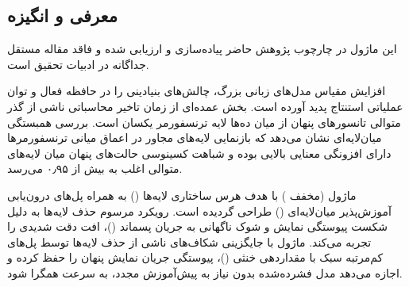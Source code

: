 \subsection{معرفی و انگیزه}
این ماژول در چارچوب پژوهش حاضر پیاده‌سازی و ارزیابی شده و فاقد مقاله مستقل جداگانه در ادبیات تحقیق است.

افزایش مقیاس مدل‌های زبانی بزرگ، چالش‌های بنیادینی را در حافظه فعال و توان عملیاتی استنتاج پدید آورده است. بخش عمده‌ای از زمان تاخیر محاسباتی ناشی از گذر متوالی تانسورهای پنهان از میان ده‌ها لایه ترنسفورمر یکسان است. بررسی همبستگی میان‌لایه‌ای نشان می‌دهد که بازنمایی لایه‌های مجاور در اعماق میانی ترنسفورمرها دارای افزونگی معنایی بالایی بوده و شباهت کسینوسی حالت‌های پنهان میان لایه‌های متوالی اغلب به بیش از ۰٫۹۵ می‌رسد.

ماژول  (مخفف ) با هدف هرس ساختاری لایه‌ها () به همراه پل‌های درون‌یابی آموزش‌پذیر میان‌لایه‌ای () طراحی گردیده است. رویکرد مرسوم حذف لایه‌ها به دلیل شکست پیوستگی نمایش و شوک ناگهانی به جریان پسماند ()، افت دقت شدیدی را تجربه می‌کند. ماژول  با جایگزینی شکاف‌های ناشی از حذف لایه‌ها توسط پل‌های کم‌مرتبه سبک با مقداردهی خنثی ()، پیوستگی جریان نمایش پنهان را حفظ کرده و اجازه می‌دهد مدل فشرده‌شده بدون نیاز به پیش‌آموزش مجدد، به سرعت همگرا شود.

